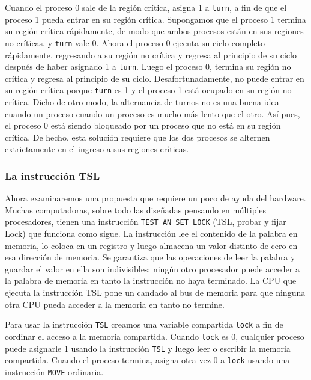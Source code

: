 \documentclass{article}
\begin{document}
Cuando el proceso 0 sale de la regi\'on cr\'itica, asigna 1 a {\tt turn}, 
a f\/in de que el proceso 1 pueda entrar en su regi\'on cr\'itica. 
Supongamos que el proceso 1 termina su regi\'on cr\'itica r\'apidamente, 
de modo que ambos procesos est\'an en sus regiones no cr\'iticas, y 
{\tt turn} vale 0. Ahora el proceso 0 ejecuta su ciclo completo 
r\'apidamente, regresando a su regi\'on no cr\'itica y regresa al principio 
de su ciclo despu\'es de haber asignado 1 a {\tt turn}. Luego el proceso 
0, termina su regi\'on no cr\'itica y regresa al principio de su ciclo. 
Desafortunadamente, no puede entrar en su regi\'on cr\'itica porque 
{\tt turn} es 1 y el proceso 1 est\'a ocupado en su regi\'on no cr\'itica. 
Dicho de otro modo, la alternancia de turnos no es una buena idea cuando 
un proceso cuando un proceso es mucho m\'as lento que el otro. As\'i pues, 
el proceso 0 est\'a siendo bloqueado por un proceso que no est\'a en su 
regi\'on cr\'itica. De hecho, esta soluci\'on requiere que los dos procesos 
se alternen extrictamente en el ingreso a sus regiones cr\'iticas.

\subsubsection*{La instrucci\'on TSL}
Ahora examinaremos una propuesta que requiere un poco de ayuda del hardware. 
Muchas computadoras, sobre todo las dise\~nadas pensando en m\'ultiples 
procesadores, tienen una instrucci\'on {\tt TEST AN SET LOCK} (TSL, probar y 
fijar Lock) que funciona como sigue. La instrucci\'on lee el contenido de la 
palabra en memoria, lo coloca en un registro y luego almacena un valor 
distinto de cero en esa direcci\'on de memoria. Se garantiza que las 
operaciones de leer la palabra y guardar el valor en ella son indivisibles; 
ning\'un otro procesador puede acceder a la palabra de memoria en tanto la 
instrucci\'on no haya terminado. La CPU que ejecuta la instrucci\'on TSL
pone un candado al bus de memoria para que ninguna otra CPU pueda acceder 
a la memoria en tanto no termine.

Para usar la instrucci\'on {\tt TSL} creamos una variable compartida {\tt lock} 
a f\/in de cordinar el acceso a la memoria compartida. Cuando {\tt lock} es 
0, cualquier proceso puede asignarle 1 usando la instrucci\'on {\tt TSL} y 
luego leer o escribir la memoria compartida. Cuando el proceso termina, 
asigna otra vez 0 a {\tt lock} usando una instrucci\'on {\tt MOVE} ordinaria.
\end{document}
